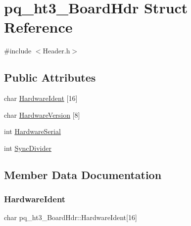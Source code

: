 \hypertarget{structpq__ht3___board_hdr}{}\section{pq\+\_\+ht3\+\_\+\+Board\+Hdr Struct Reference}
\label{structpq__ht3___board_hdr}


{\ttfamily \#include $<$Header.\+h$>$}

\subsection*{Public Attributes}
\begin{DoxyCompactItemize}
\item 
char \hyperlink{structpq__ht3___board_hdr_a141a3f76e03c24ecc0ee8571620400d0}{Hardware\+Ident} \mbox{[}16\mbox{]}
\item 
char \hyperlink{structpq__ht3___board_hdr_ae37b0ecf51eefbeb9d1181184e988046}{Hardware\+Version} \mbox{[}8\mbox{]}
\item 
int \hyperlink{structpq__ht3___board_hdr_ab2449f0ae34f6bc9d132e835076fa769}{Hardware\+Serial}
\item 
int \hyperlink{structpq__ht3___board_hdr_a322eae8d2fa745909ed7031645a56126}{Sync\+Divider}
\end{DoxyCompactItemize}


\subsection{Member Data Documentation}
\mbox{\label{structpq__ht3___board_hdr_a141a3f76e03c24ecc0ee8571620400d0}} 
\subsubsection{\texorpdfstring{Hardware\+Ident}{HardwareIdent}}
{\footnotesize\ttfamily char pq\+\_\+ht3\+\_\+\+Board\+Hdr\+::\+Hardware\+Ident\mbox{[}16\mbox{]}}

\mbox{\label{structpq__ht3___board_hdr_ab2449f0ae34f6bc9d132e835076fa769}} 
